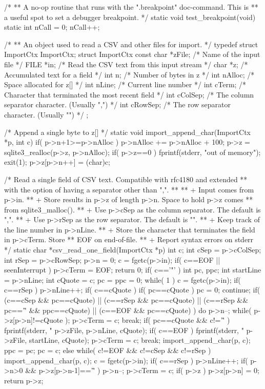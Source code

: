 \begin{Codex}[label=shell.c,numbers=left]
{/*
** A no-op routine that runs with the ".breakpoint" doc-command.  This is
** a useful spot to set a debugger breakpoint.
*/
static void test_breakpoint(void){
  static int nCall = 0;
  nCall++;
}

/*
** An object used to read a CSV and other files for import.
*/
typedef struct ImportCtx ImportCtx;
struct ImportCtx {
  const char *zFile;  /* Name of the input file */
  FILE *in;           /* Read the CSV text from this input stream */
  char *z;            /* Accumulated text for a field */
  int n;              /* Number of bytes in z */
  int nAlloc;         /* Space allocated for z[] */
  int nLine;          /* Current line number */
  int cTerm;          /* Character that terminated the most recent field */
  int cColSep;        /* The column separator character.  (Usually ",") */
  int cRowSep;        /* The row separator character.  (Usually "\n") */
};

/* Append a single byte to z[] */
static void import_append_char(ImportCtx *p, int c){
  if( p->n+1>=p->nAlloc ){
    p->nAlloc += p->nAlloc + 100;
    p->z = sqlite3_realloc(p->z, p->nAlloc);
    if( p->z==0 ){
      fprintf(stderr, "out of memory\n");
      exit(1);
    }
  }
  p->z[p->n++] = (char)c;
}

/* Read a single field of CSV text.  Compatible with rfc4180 and extended
** with the option of having a separator other than ",".
**
**   +  Input comes from p->in.
**   +  Store results in p->z of length p->n.  Space to hold p->z comes
**      from sqlite3_malloc().
**   +  Use p->cSep as the column separator.  The default is ",".
**   +  Use p->rSep as the row separator.  The default is "\n".
**   +  Keep track of the line number in p->nLine.
**   +  Store the character that terminates the field in p->cTerm.  Store
**      EOF on end-of-file.
**   +  Report syntax errors on stderr
*/
static char *csv_read_one_field(ImportCtx *p){
  int c;
  int cSep = p->cColSep;
  int rSep = p->cRowSep;
  p->n = 0;
  c = fgetc(p->in);
  if( c==EOF || seenInterrupt ){
    p->cTerm = EOF;
    return 0;
  }
  if( c=='"' ){
    int pc, ppc;
    int startLine = p->nLine;
    int cQuote = c;
    pc = ppc = 0;
    while( 1 ){
      c = fgetc(p->in);
      if( c==rSep ) p->nLine++;
      if( c==cQuote ){
        if( pc==cQuote ){
          pc = 0;
          continue;
        }
      }
      if( (c==cSep && pc==cQuote)
       || (c==rSep && pc==cQuote)
       || (c==rSep && pc=='\r' && ppc==cQuote)
       || (c==EOF && pc==cQuote)
      ){
        do{ p->n--; }while( p->z[p->n]!=cQuote );
        p->cTerm = c;
        break;
      }
      if( pc==cQuote && c!='\r' ){
        fprintf(stderr, "%
                p->zFile, p->nLine, cQuote);
      }
      if( c==EOF ){
        fprintf(stderr, "%
                p->zFile, startLine, cQuote);
        p->cTerm = c;
        break;
      }
      import_append_char(p, c);
      ppc = pc;
      pc = c;
    }
  }else{
    while( c!=EOF && c!=cSep && c!=rSep ){
      import_append_char(p, c);
      c = fgetc(p->in);
    }
    if( c==rSep ){
      p->nLine++;
      if( p->n>0 && p->z[p->n-1]=='\r' ) p->n--;
    }
    p->cTerm = c;
  }
  if( p->z ) p->z[p->n] = 0;
  return p->z;
}

}
\end{Codex}
